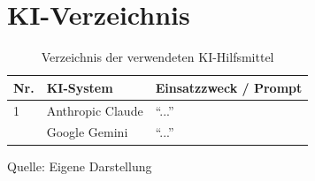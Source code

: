 \documentclass[12pt,a4paper]{article}
\renewcommand{\footnotesize}{\fontsize{10pt}{12pt}\selectfont}
\newcommand{\tabformat}{%
  \centering
  \singlespacing
  \footnotesize
  \setlength{\tabcolsep}{5pt}%
  \renewcommand{\arraystretch}{1.15}%
}
\newcommand{\tabquelle}[1][Eigene Darstellung]{%
  \par\setlength{\parskip}{0pt}\vspace{3pt}%
  {\setstretch{1}\fontsize{9pt}{11pt}\selectfont\raggedright Quelle: #1\par}%
}
\begin{document}
\newpage
{}
\section*{KI-Verzeichnis}

\begin{table}[H]
    \tabformat
    \caption*{Verzeichnis der verwendeten KI-Hilfsmittel}
    \begin{tabularx}{\textwidth}{@{}L{0.8cm} L{2.8cm} Y@{}}
        \toprule
        \textbf{Nr.} & \textbf{KI-System} & \textbf{Einsatzzweck / Prompt} \\
         & Anthropic Claude & \enquote{...} \\
         & Google Gemini & \enquote{...} \\
        \bottomrule
    \end{tabularx}
    \tabquelle
\end{table}
\end{document}
